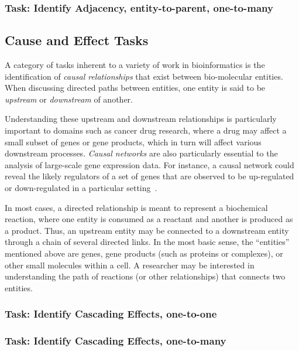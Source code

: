 \documentclass{egpubl}
\begin{document}
\subsubsection{Task: Identify Adjacency, entity-to-parent, one-to-many}

\subsection{Cause and Effect Tasks}
A category of tasks inherent to a variety of work in bioinformatics is the identification of \textit{causal relationships} that exist between bio-molecular entities.
When discussing directed paths between entities, one entity is said to be \emph{upstream} or \emph{downstream} of another.

Understanding these upstream and downstream relationships is particularly important to domains such as cancer drug research, where a drug may affect a small subset of genes or gene products, which in turn will affect various downstream processes.
\emph{Causal networks} are also particularly essential to the analysis of large-scale gene expression data.
For instance, a causal network could reveal the likely regulators of a set of genes that are observed to be up-regulated or down-regulated in a particular setting~\cite{felciano2013predictive, Kramer2013ipa-causal}.

In most cases, a directed relationship is meant to represent a biochemical reaction, where one entity is consumed as a reactant and another is produced as a product.
Thus, an upstream entity may be connected to a downstream entity through a chain of several directed links.
In the most basic sense, the ``entities'' mentioned above are genes, gene products (such as proteins or complexes), or other small molecules within a cell.
A researcher may be interested in understanding the path of reactions (or other relationships) that connects two entities.


\subsubsection{Task: Identify Cascading Effects, one-to-one}
\subsubsection{Task: Identify Cascading Effects, one-to-many}
\end{document}
